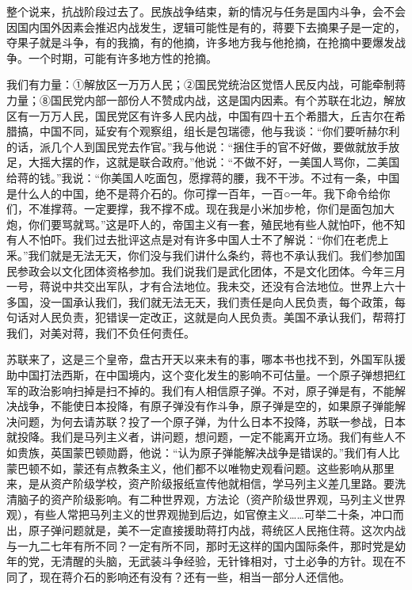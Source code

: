 整个说来，抗战阶段过去了。民族战争结束，新的情况与任务是国内斗争，会不会因国内国外因素会推迟内战发生，逻辑可能性是有的，蒋要下去摘果子是一定的，夺果子就是斗争，有的我摘，有的他摘，许多地方我与他抢摘，在抢摘中要爆发战争。一个时期，可能有许多地方性的抢摘。

我们有力量：①解放区一万万人民；②国民党统治区觉悟人民反内战，可能牵制蒋力量；⑧国民党内部一部份人不赞成内战，这是国内因素。有个苏联在北边，解放区有一万万人民，国民党区有许多人民内战，中国有四十五个希腊大，丘吉尔在希腊搞，中国不同，延安有个观察组，组长是包瑞德，他与我谈：“你们要听赫尔利的话，派几个人到国民党去作官。”我与他说：“捆住手的官不好做，要做就放手放足，大摇大摆的作，这就是联合政府。”他说：“不做不好，一美国人骂你，二美国给蒋的钱。”我说：“你美国人吃面包，愿撑蒋的腰，我不干涉。不过有一条，中国是什么人的中国，绝不是蒋介石的。你可撑一百年，一百○一年。我下命令给你们，不准撑蒋。一定要撑，我不撑不成。现在我是小米加步枪，你们是面包加大炮，你们要骂就骂。”这是吓人的，帝国主义有一套，殖民地有些人就怕吓，他不知有人不怕吓。我们过去批评这点是对有许多中国人士不了解说：“你们在老虎上釆。”我们就是无法无天，你们没与我们讲什么条约，蒋也不承认我们。我们参加国民参政会以文化团体资格参加。我们说我们是武化团体，不是文化团体。今年三月一号，蒋说中共交出军队，才有合法地位。我未交，还没有合法地位。世界上六十多国，没一国承认我们，我们就无法无天，我们责任是向人民负责，每个政策，每句话对人民负责，犯错误一定改正，这就是向人民负责。美国不承认我们，帮蒋打我们，对美对蒋，我们不负任何责任。

苏联来了，这是三个皇帝，盘古开天以来未有的事，哪本书也找不到，外国军队援助中国打法西斯，在中国境内，这个变化发生的影响不可估量。一个原子弹想把红军的政治影响扫掉是扫不掉的。我们有人相信原子弹。不对，原子弹是有，不能解决战争，不能使日本投降，有原子弹没有作斗争，原子弹是空的，如果原子弹能解决问题，为何去请苏联？投了一个原子弹，为什么日本不投降，苏联一参战，日本就投降。我们是马列主义者，讲问题，想问题，一定不能离开立场。我们有些人不如贵族，英国蒙巴顿勋爵，他说：“认为原子弹能解决战争是错误的。”我们有人比蒙巴顿不如，蒙还有点教条主义，他们都不以唯物史观看问题。这些影响从那里来，是从资产阶级学校，资产阶级报纸宣传他就相信，学马列主义差几里路。要洗清脑子的资产阶级影响。有二种世界观，方法论（资产阶级世界观，马列主义世界观），有些人常把马列主义的世界观抛到后边，如官僚主义……可举二十条，冲口而出，原子弹问题就是，美不一定直接援助蒋打内战，蒋统区人民拖住蒋。这次内战与一九二七年有所不同？一定有所不同，那时无这样的国内国际条件，那时党是幼年的党，无清醒的头脑，无武装斗争经验，无针锋相对，寸土必争的方针。现在不同了，现在蒋介石的影响还有没有？还有一些，相当一部分人还信他。

